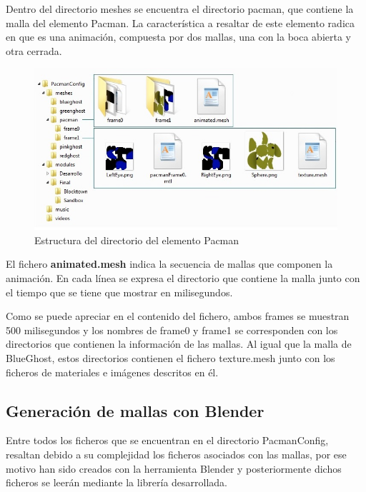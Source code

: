 Dentro del directorio meshes se encuentra el directorio pacman, que contiene la malla del elemento Pacman. La característica a resaltar de este elemento radica en que es una animación, compuesta por dos mallas, una con la boca abierta y otra cerrada.

\begin{figure}[h]
\centering
\includegraphics[width=14.5cm]{img/EstructuraPacman.jpg}	
\caption{Estructura del directorio del elemento Pacman}
\end{figure}

El fichero \textbf{animated.mesh} indica la secuencia de mallas que componen la animación. En cada línea se expresa el directorio que contiene la malla junto con el tiempo que se tiene que mostrar en milisegundos. 



Como se puede apreciar en el contenido del fichero, ambos frames se muestran 500 milisegundos y los nombres de frame0 y frame1 se corresponden con los directorios que contienen la información de las mallas. Al igual que la malla de BlueGhost, estos directorios contienen el fichero texture.mesh junto con los ficheros de materiales e imágenes descritos en él.




\subsection{Generación de mallas con Blender}

Entre todos los ficheros que se encuentran en el directorio PacmanConfig, resaltan debido a su complejidad los ficheros asociados con las mallas, por ese motivo han sido creados con la herramienta Blender y posteriormente dichos ficheros se leerán mediante la librería desarrollada.
\newline


